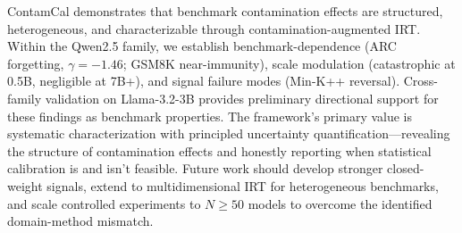 \documentclass[11pt]{article}
\begin{document}
ContamCal demonstrates that benchmark contamination effects are structured, heterogeneous, and characterizable through contamination-augmented IRT. Within the Qwen2.5 family, we establish benchmark-dependence (ARC forgetting, $\gamma = -1.46$; GSM8K near-immunity), scale modulation (catastrophic at 0.5B, negligible at 7B+), and signal failure modes (Min-K++ reversal). Cross-family validation on Llama-3.2-3B provides preliminary directional support for these findings as benchmark properties. The framework's primary value is systematic characterization with principled uncertainty quantification---revealing the structure of contamination effects and honestly reporting when statistical calibration is and isn't feasible. Future work should develop stronger closed-weight signals, extend to multidimensional IRT for heterogeneous benchmarks, and scale controlled experiments to $N \geq 50$ models to overcome the identified domain-method mismatch.
\end{document}
